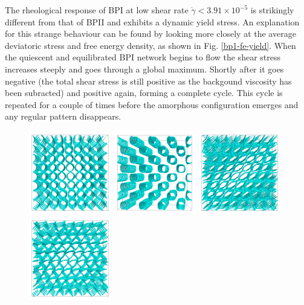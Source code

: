 \documentclass[aps,pre,reprint,superscriptaddress, twocolumn]{revtex4}
\newcommand{\e}[1]{\times10^{#1}}
\newcommand{\gd}{\dot{\gamma}}
\begin{document}
The rheological response of BPI at low shear rate $\gd<3.91\e{-5}$ 
is strikingly different from that of BPII and exhibits a
dynamic yield stress.
An explanation for this strange behaviour can be found by 
looking more closely at the average deviatoric stress and 
free energy density, as shown in Fig. \ref{bp1-fe-yield}.
When the quiescent and equilibrated BPI network begins to flow
the shear stress increases steeply and goes through a global maximum.
Shortly after it goes negative (the total shear stress is still
positive as the backgound viscosity has been subracted) and positive
again, forming a complete cycle. 
This cycle is repeated for a couple of times before 
the amorphous configuration emerges and any regular pattern
disappears.

\begin{figure}[htpb]
\includegraphics[width=0.32\textwidth]{disc-xy-400k_run1115.png}
\includegraphics[width=0.32\textwidth]{disc-yz-400k_run1115.png}
\includegraphics[width=0.32\textwidth]{disc-xy-700k_run1115.png}\\
\includegraphics[width=0.32\textwidth]{disc-xy-750k_run1115.png}

\end{figure}
\end{document}
